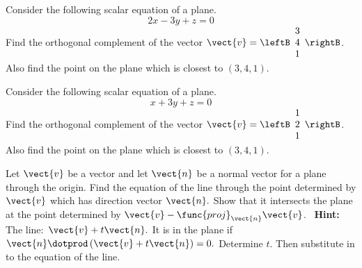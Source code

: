 \begin{enumialphparenastyle}

\begin{ex} Consider the following scalar equation of a plane. 
\begin{equation*}
2x-3y+z=0
\end{equation*}
Find the orthogonal complement of the vector $\vect{v}=\leftB \begin{array}{r}
3\\
4 \\
1
\end{array}
\rightB $.
Also find the point on the plane which is closest to $\left( 3,4,1\right) .$
\end{ex}


\begin{ex} Consider the following scalar equation of a plane. 
\begin{equation*}
x+3y+z=0
\end{equation*}
Find the orthogonal complement of the vector $\vect{v}=\leftB
\begin{array}{r}
 1 \\
2 \\
1
\end{array}
\rightB $.
Also find the point on the plane which is closest to $\left( 3,4,1\right) .$
\end{ex}

\begin{ex} Let $\vect{v}$ be a vector and let $\vect{n}$ be a normal vector for a
plane through the origin. Find the equation of the line through the point
determined by $\vect{v}$ which has direction vector $\vect{n}.$ Show that it
intersects the plane at the point determined by $\vect{v}-\func{proj}_{\vect{n}
}\vect{v}$. \ \textbf{Hint: }The line:\ $\vect{v}+t\vect{n}.$ It is in the
plane if $\vect{n}\dotprod \left( \vect{v}+t\vect{n}\right) =0.$ Determine $t$.
Then substitute in to the equation of the line.
\end{ex}


\end{enumialphparenastyle}
